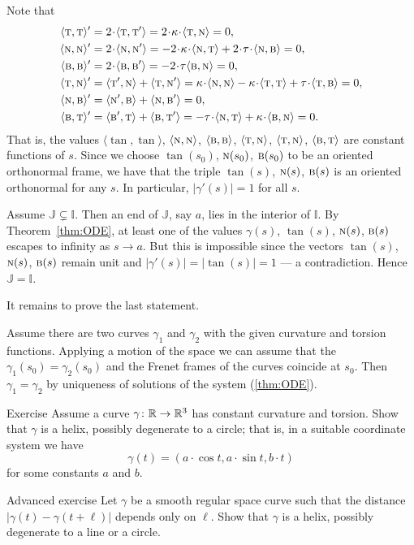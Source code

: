 Note that 
\begin{align*}
\langle\tan,\tan\rangle'
&=
2\cdot\langle\tan,\tan'\rangle
=
2\cdot\kur\cdot \langle\tan,\norm\rangle
=
0,
\\
\langle\norm,\norm\rangle'
&=
2\cdot\langle\norm,\norm'\rangle
=
-
2\cdot\kur\cdot\langle\norm,\tan\rangle
+
2\cdot\tor\cdot\langle\norm,\bi\rangle
=
0,
\\
\langle\bi,\bi\rangle'
&=
2\cdot\langle\bi,\bi'\rangle
=
-2\cdot\tor\langle\bi,\norm\rangle
=
0,
\\
\langle\tan,\norm\rangle'
&=
\langle\tan',\norm\rangle
+
\langle\tan,\norm'\rangle
=
\kur\cdot\langle\norm,\norm\rangle
-
\kur\cdot\langle\tan,\tan\rangle
+
\tor\cdot\langle\tan,\bi\rangle
=
0,
\\
\langle\norm,\bi\rangle'
&=
\langle\norm',\bi\rangle+\langle\norm,\bi'\rangle
=0,
\\
\langle\bi,\tan\rangle'
&=
\langle\bi',\tan\rangle+\langle\bi,\tan'\rangle
=
-\tor\cdot \langle\norm,\tan\rangle
+\kur\cdot\langle\bi,\norm\rangle
=0.
\end{align*}
That is, the values 
$\langle\tan,\tan\rangle$,
$\langle\textsc{n},\textsc{n}\rangle$,
$\langle\textsc{b},\textsc{b}\rangle$,
$\langle\textsc{t},\textsc{n}\rangle$,
$\langle\textsc{t},\textsc{n}\rangle$,
$\langle\textsc{b},\textsc{t}\rangle$
are constant functions of $s$.
Since we choose $\tan(s_0)$, $\textsc{n}(s_0)$, $\textsc{b}(s_0)$ to be an oriented orthonormal frame, we have that the triple $\tan(s)$, $\textsc{n}(s)$, $\textsc{b}(s)$ is an oriented orthonormal for any $s$. In particular, $|\gamma'(s)|=1$ for all $s$.

Assume $\mathbb{J} \varsubsetneq \mathbb{I}$. Then an end of $\mathbb{J}$, say $a$, lies in the interior of $\mathbb{I}$.
By Theorem~\ref{thm:ODE}, at least one of the values $\gamma(s)$, $\tan(s)$, $\textsc{n}(s)$, $\textsc{b}(s)$
escapes to infinity as $s\to a$.
But this is impossible since the vectors $\tan(s)$, $\textsc{n}(s)$, $\textsc{b}(s)$ remain unit and $|\gamma'(s)|=|\tan(s)|=1$ --- a contradiction.
Hence $\mathbb{J}= \mathbb{I}$.

It remains to prove the last statement.

Assume there are two curves $\gamma_1$ and $\gamma_2$ with the given curvature and torsion functions.
Applying a motion of the space we can assume that the $\gamma_1(s_0)=\gamma_2(s_0)$ and the Frenet frames of the curves coincide at $s_0$.
Then $\gamma_1=\gamma_2$ by uniqueness of  solutions of the system (\ref{thm:ODE}).
\qeds

\begin{thm}{Exercise}\label{ex:cur+tor=helix}
Assume a curve $\gamma\colon\mathbb{R}\to\mathbb{R}^3$ has constant curvature and torsion.
Show that $\gamma$ is a helix, possibly degenerate to a circle;
that is, in a suitable coordinate system we have
\[\gamma(t)=(a\cdot \cos t,a\cdot\sin t, b\cdot t)\]
for some constants $a$ and $b$.
\end{thm}


\begin{thm}{Advanced exercise}\label{ex:const-dist}
Let $\gamma$ be a smooth regular space curve such that the distance $|\gamma(t)-\gamma(t+\ell)|$ depends only on $\ell$.
Show that $\gamma$ is a helix, possibly degenerate to a line or a circle.
\end{thm}

